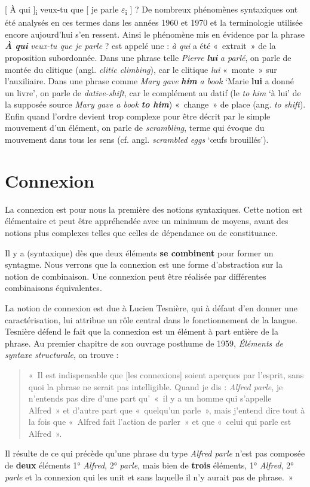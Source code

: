 {    \ea{}
        [ À qui ]{\textsubscript{i}} veux-tu que [ je parle $\varepsilon ${\textsubscript{i}} ] ?
    \z
    De nombreux phénomènes syntaxiques ont été analysés en ces termes dans les années 1960 et 1970 et la terminologie utilisée encore aujourd’hui s’en ressent. Ainsi le phénomène mis en évidence par la phrase \textbf{\textit{À} \textit{qui}} \textit{veux-tu que je parle} ? est appelé une : \textit{à qui} a été «~extrait~» de la proposition subordonnée. Dans une phrase telle \textit{Pierre} \textbf{\textit{lui}} \textit{a parlé}, on parle de montée du clitique (angl. \textit{clitic climbing}), car le clitique \textit{lui} «~monte~» sur l’auxiliaire. Dans une phrase comme \textit{Mary gave} \textbf{\textit{him}} \textit{a book} ‘Marie \textbf{lui} a donné un livre’, on parle de \textit{dative-shift}, car le complément au datif (le \textit{to him} ‘à lui’ de la supposée source \textit{Mary gave a book} \textbf{\textit{to him}}) «~change~» de place (ang. \textit{to shift}). Enfin quand l’ordre devient trop complexe pour être décrit par le simple mouvement d’un élément, on parle de \textit{scrambling}, terme qui évoque du mouvement dans tous les sens (cf. angl. \textit{scrambled eggs} ‘œufs brouillés’).
}
\section{Connexion}\label{sec:3.2.8}

La connexion est pour nous la première des notions syntaxiques. Cette notion est élémentaire et peut être appréhendée avec un minimum de moyens, avant des notions plus complexes telles que celles de dépendance ou de constituance.

{Il y a  (syntaxique) dès que deux éléments \textbf{se combinent} pour former un syntagme. Nous verrons que la connexion est une forme d’abstraction sur la notion de combinaison. Une connexion peut être réalisée par différentes combinaisons équivalentes.}

La notion de connexion est due à Lucien Tesnière, qui à défaut d’en donner une caractérisation, lui attribue un rôle central dans le fonctionnement de la langue. Tesnière défend le fait que la connexion est un élément à part entière de la phrase. Au premier chapitre de son ouvrage posthume de 1959, \textit{Éléments de syntaxe structurale}, on trouve :

\begin{quote}
    «~Il est indispensable que [les connexions] soient aperçues par l’esprit, sans quoi la phrase ne serait pas intelligible. Quand je dis : \textit{Alfred parle}, je n’entends pas dire d’une part qu’~«~il y a un homme qui s’appelle Alfred~» et d’autre part que «~quelqu’un parle~», mais j’entend dire tout à la fois que «~Alfred fait l’action de parler~» et que «~celui qui parle est Alfred~».
\end{quote}
Il résulte de ce qui précède qu’une phrase du type \textit{Alfred parle} n’est pas composée de \textbf{deux} éléments 1° \textit{Alfred}, 2° \textit{parle}, mais bien de \textbf{trois} éléments, 1° \textit{Alfred}, 2° \textit{parle} et la connexion qui les unit et sans laquelle il n’y aurait pas de phrase.~»

